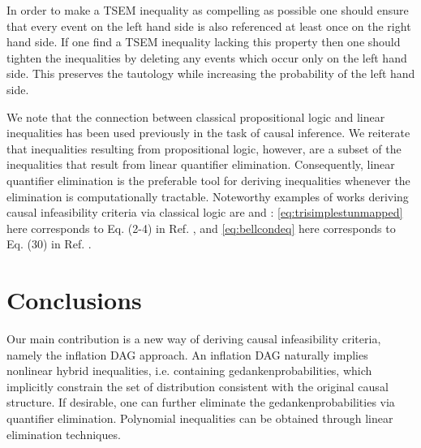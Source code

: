 {In order to make a TSEM inequality as compelling as possible one should ensure that every event on the left hand side is also referenced at least once on the right hand side. If one find a TSEM inequality lacking this property then one should tighten the inequalities by deleting any events which occur only on the left hand side. This preserves the tautology while increasing the probability of the left hand side.

We note that the connection between classical propositional logic and linear inequalities has been used previously in the task of causal inference. We reiterate that inequalities resulting from propositional logic, however, are a subset of the inequalities that result from linear quantifier elimination. Consequently, linear quantifier elimination is the preferable tool for deriving inequalities whenever the elimination is computationally tractable. Noteworthy examples of works deriving causal infeasibility criteria via classical logic are \citet{Pitowsky1989} and \citet{Ghirardi08}: \cref{eq:trisimplestunmapped} here corresponds to Eq. (2-4) in Ref. \cite{Pitowsky1989}, and \cref{eq:bellcondeq} here corresponds to Eq. (30) in Ref. \cite{Ghirardi08}.






\section{Conclusions}

Our main contribution is a new way of deriving causal infeasibility criteria, namely the inflation DAG approach. An inflation DAG naturally implies nonlinear hybrid inequalities, i.e. containing gedankenprobabilities, which implicitly constrain the set of distribution consistent with the original causal structure. If desirable, one can further eliminate the gedankenprobabilities via quantifier elimination. Polynomial inequalities can be obtained through linear elimination techniques.

}
